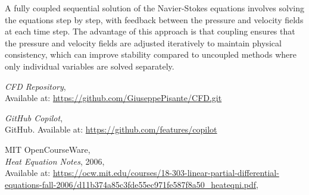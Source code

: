 \documentclass{article}
\begin{document}
A fully coupled sequential solution of the Navier-Stokes equations involves solving the equations step by step, with feedback between the 
pressure and velocity fields at each time step. The advantage of this approach is that coupling ensures that the pressure and velocity fields
are adjusted iteratively to maintain physical consistency, which can improve stability compared to uncoupled methods where only individual 
variables are solved separately.


\begin{thebibliography}{9}
  \textit{CFD Repository},\\
  Available at: \url{https://github.com/GiuseppePisante/CFD.git}
  
  \textit{GitHub Copilot},\\
  GitHub. Available at: \url{https://github.com/features/copilot}
  
  MIT OpenCourseWare,\\
  \textit{Heat Equation Notes}, 2006,\\
  Available at: \url{https://ocw.mit.edu/courses/18-303-linear-partial-differential-equations-fall-2006/d11b374a85c3fde55ec971fe587f8a50_heateqni.pdf},\\
\end{thebibliography}
\end{document}
